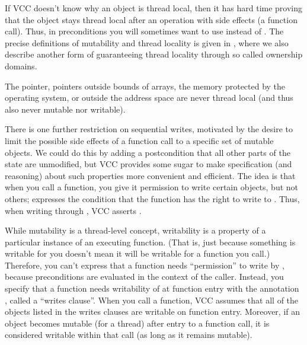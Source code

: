 \begin{note}
If VCC doesn't know why an object is thread local, then it has
hard time proving that the object stays thread local after an operation
with side effects (\eg a function call).
Thus, in preconditions you will sometimes want to use
 instead of .
The precise definitions of mutability and thread locality
is given in ,
where we also describe another form of guaranteeing thread locality
through so called ownership domains.
\end{note}

The  pointer, pointers outside bounds of arrays,
the memory protected by the operating system, or outside
the address space are never thread local (and thus also never mutable
nor writable).

There is one further restriction on sequential writes, motivated by
the desire to limit the possible side effects of a function call to a
specific set of mutable objects. We could do this by adding a
postcondition that all other parts of the state are unmodified, but
VCC provides some sugar to make specification (and reasoning) about
such properties more convenient and efficient. The idea is that when
you call a function, you give it permission to write certain objects,
but not others;  expresses the condition that
the function has the right to write to
. Thus, when writing through , VCC asserts
.

While mutability is a thread-level concept, writability is a property
of a particular instance of an executing function. (That is, just
because something is writable for you doesn't mean it will be writable
for a function you call.) Therefore, you can't express that a function
needs ``permission'' to write  by 
,
because preconditions are evaluated in the context
of the caller. Instead, you specify that a function needs writability
of  at function entry with the annotation ,
called a ``writes clause''. When you call a function, VCC assumes that
all of the objects listed in the writes clauses are writable on
function entry.  Moreover, if an object becomes mutable (for a thread)
after entry to a function call, it is considered writable within that
call (as long as it remains mutable).


